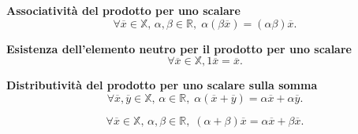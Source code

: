 \begin{definition}
    \begin{property}
        \textbf{Associatività del prodotto per uno scalare}
        \[ \forall\overline{x}\in\mathbb{X},\, \alpha,\beta\in\mathbb{R},\;
        \alpha\left(\beta \overline{x}\right) = \left(\alpha\beta\right)\overline{x}. \]
    \end{property}
    \begin{property}
        \textbf{Esistenza dell'elemento neutro per il prodotto per uno scalare}
        \[ \forall \overline{x}\in\mathbb{X}, 1\overline{x}=\overline{x}.\]
    \end{property}
    \begin{property}
        \textbf{Distributività del prodotto per uno scalare sulla somma}
        \[ \forall\overline{x},\overline{y}\in\mathbb{X},\, \alpha\in\mathbb{R},\;
        \alpha\left(\overline{x}+\overline{y}\right) = \alpha\overline{x}+\alpha\overline{y}. \]
        
        \[ \forall\overline{x}\in\mathbb{X},\, \alpha,\beta\in\mathbb{R},\;
        \left(\alpha+\beta\right)\overline{x} = \alpha\overline{x}+\beta\overline{x}. \]
    \end{property}
\end{definition}